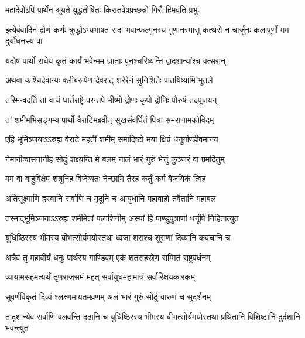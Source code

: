 \twolineshloka
{महादेवोऽपि पार्थेन श्रूयते युद्धतोषितः}
{किरातवेषप्रच्छन्नो गिरौ हिमवति प्रभुः}


\onelineshloka
{इत्येवंवादिनं द्रोणं कर्णः क्रुद्धोऽभ्यभाषत}
\twolineshloka
{सदा भवान्फल्गुनस्य गुणानस्मासु कत्थसे}
{न चार्जुनः कलापूर्णो मम दुर्योधनस्य वा}




\twolineshloka
{यद्येष पार्थो राधेय कृतं कार्यं भवेन्मम}
{ज्ञाताः पुनश्चरिष्यन्ति द्वादशान्यांश्च वत्सरान्}


\twolineshloka
{अथवा कश्चिदेवान्यः क्लीबरूपेण देवराट्}
{शरैरेनं सुनिशितैः पातयिष्यामि भूतले}



\twolineshloka
{तस्मिन्वदति तां वाचं धार्तराष्ट्रे परन्तपे}
{भीष्मो द्रोणः कृपो द्रौणिः पौरुषं तदपूजयन्}


\twolineshloka
{तां शमीमभिसङ्गम्य पार्थो वैराटिमब्रवीत्}
{सुखसंवर्धितं पित्रा समराणामकोविदम्}


\twolineshloka
{एहि भूमिञ्जयाऽऽरुह्य वैराटे महतीं शमीम्}
{समादिष्टो मया क्षिप्रं धनुर्गाण्डीवमानय}


\twolineshloka
{नेमानीष्वासनानीह सोढुं शक्ष्यन्ति मे बलम्}
{नालं भारं गुरुं भेत्तुं कुञ्जरं वा प्रमर्दितुम्}


\twolineshloka
{मम वा बाहुविक्षेपं शत्रूनिह विजेष्यतः}
{नेच्छामि तैरहं कर्तुं कर्म वैजयिकं त्विह}


\twolineshloka
{अतिसूक्ष्माणि ह्रस्वानि सर्वाणि च मृदूनि च}
{आयुधानि महाबाहो तवैतानि महाबल}


\twolineshloka
{तस्माद्भूमिञ्जयाऽऽरुह्य शमीमेतां पलाशिनीम्}
{अस्यां हि पाण्डुपुत्राणां धनूंषि निहितात्युत}


\twolineshloka
{युधिष्ठिरस्य भीमस्य बीभत्सोर्यमयोस्तथा}
{ध्वजा शराश्च शूराणां दिव्यानि कवचानि च}


\twolineshloka
{अत्रैव तु महावीर्यं धनुः पार्थस्य गाण्डिवम्}
{एकं शतसहस्रेण सम्मितं राष्ट्रवर्धनम्}


\twolineshloka
{व्यायामसहमत्यर्थं तृणराजसमं महत्}
{सर्वायुधमहामात्रं सर्वारिक्षयकारकम्}


\twolineshloka
{सुवर्णविकृतं दिव्यं श्लक्ष्णमायतमव्रणम्}
{अलं भारं गुरुं सोढुं वारुणं च सुदर्शनम्}


\threelineshloka
{तादृशान्येव सर्वाणि बलवन्ति दृढानि च}
{युधिष्ठिरस्य भीमस्य बीभत्सोर्यमयोस्तथा}
{प्रथितानि विशिष्टानि दुर्दशानि भवन्त्युत}




